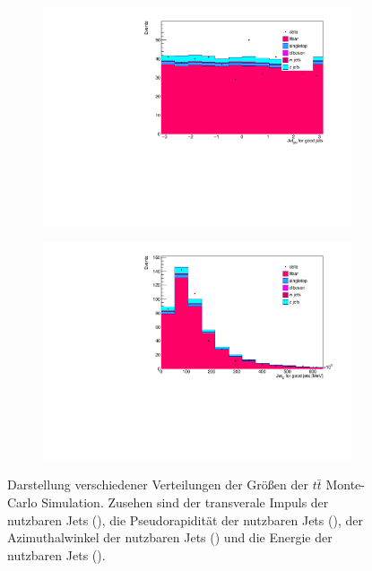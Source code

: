 \begin{figure}
\begin{subfigure}{0.5\textwidth}
    \includegraphics[width=\linewidth]{plots_and_txt/stacked_plots/stacked_jet_phi_good.pdf}
    \caption{}
    \label{fig:stacked_jet_pt_good3}
  \end{subfigure}%
  \begin{subfigure}{0.5\textwidth}
    \centering
    \includegraphics[width=\linewidth]{plots_and_txt/stacked_plots/stacked_jet_E_good.pdf}
    \caption{}
    \label{fig:stacked_met_et3}
  \end{subfigure}%
  \caption{Darstellung verschiedener Verteilungen der Größen der $t\bar{t}$ Monte-Carlo Simulation.
  Zusehen sind der transverale Impuls der nutzbaren Jets (), 
  die Pseudorapidität der nutzbaren Jets (), der Azimuthalwinkel der nutzbaren Jets () 
  und die Energie der nutzbaren Jets ().
  }
  \label{fig:stacked_Distributions3}
\end{figure}

